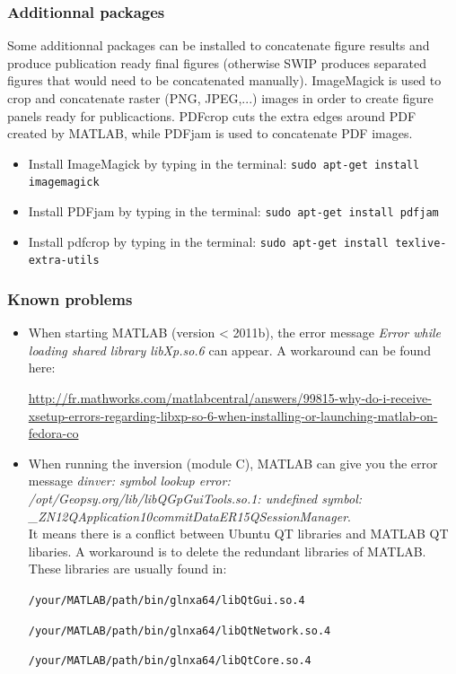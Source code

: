\documentclass[twoside,a4paper]{article}
\begin{document}
\subsubsection{Additionnal packages}
Some additionnal packages can be installed to concatenate figure results and produce publication ready final figures (otherwise SWIP produces separated figures that would need to be concatenated manually). ImageMagick is used to crop and concatenate raster (PNG, JPEG,...) images in order to create figure panels ready for publicactions. PDFcrop cuts the extra edges around PDF created by MATLAB, while PDFjam is used to concatenate PDF images.
\begin{itemize}
\setlength\itemsep{2ex}
\item Install ImageMagick by typing in the terminal: \verb|sudo apt-get install imagemagick|
\item Install PDFjam by typing in the terminal: \verb|sudo apt-get install pdfjam|
\item Install pdfcrop by typing in the terminal: \verb|sudo apt-get install texlive-extra-utils|
\end{itemize}

\subsubsection{Known problems}
\begin{itemize}
\setlength\itemsep{2ex}
\setlength{\parindent}{5ex}
\item When starting MATLAB (version < 2011b), the error message \textit{Error while loading shared library libXp.so.6} can appear. A workaround can be found here:

\url{http://fr.mathworks.com/matlabcentral/answers/99815-why-do-i-receive-xsetup-errors-regarding-libxp-so-6-when-installing-or-launching-matlab-on-fedora-co}

\item When running the inversion (module C), MATLAB can give you the error message \textit{dinver: symbol lookup error: /opt/Geopsy.org/lib/libQGpGuiTools.so.1: undefined symbol: \_ZN12QApplication10commitDataER15QSessionManager}.\\[1ex]
It means there is a conflict between Ubuntu QT libraries and MATLAB QT libaries. A workaround is to delete the redundant libraries of MATLAB. These libraries are usually found in:

\verb|/your/MATLAB/path/bin/glnxa64/libQtGui.so.4|

\verb|/your/MATLAB/path/bin/glnxa64/libQtNetwork.so.4|

\verb|/your/MATLAB/path/bin/glnxa64/libQtCore.so.4|
\end{itemize}
\end{document}
